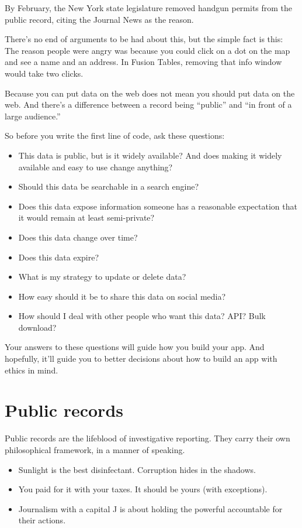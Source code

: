 \documentclass[
  letterpaper,
  DIV=11,
  numbers=noendperiod]{scrreprt}
\providecommand{\tightlist}{%
  \setlength{\itemsep}{0pt}\setlength{\parskip}{0pt}}\usepackage{longtable,booktabs,array}
\begin{document}
By February, the New York state legislature removed handgun permits from
the public record, citing the Journal News as the reason.

There's no end of arguments to be had about this, but the simple fact is
this: The reason people were angry was because you could click on a dot
on the map and see a name and an address. In Fusion Tables, removing
that info window would take two clicks.

Because you can put data on the web does not mean you should put data on
the web. And there's a difference between a record being ``public'' and
``in front of a large audience.''

So before you write the first line of code, ask these questions:

\begin{itemize}
\tightlist
\item
  This data is public, but is it widely available? And does making it
  widely available and easy to use change anything?
\item
  Should this data be searchable in a search engine?
\item
  Does this data expose information someone has a reasonable expectation
  that it would remain at least semi-private?
\item
  Does this data change over time?
\item
  Does this data expire?
\item
  What is my strategy to update or delete data?
\item
  How easy should it be to share this data on social media?
\item
  How should I deal with other people who want this data? API? Bulk
  download?
\end{itemize}

Your answers to these questions will guide how you build your app. And
hopefully, it'll guide you to better decisions about how to build an app
with ethics in mind.


\hypertarget{public-records}{%
\chapter{Public records}\label{public-records}}

Public records are the lifeblood of investigative reporting. They carry
their own philosophical framework, in a manner of speaking.

\begin{itemize}
\tightlist
\item
  Sunlight is the best disinfectant. Corruption hides in the shadows.
\item
  You paid for it with your taxes. It should be yours (with exceptions).
\item
  Journalism with a capital J is about holding the powerful accountable
  for their actions.
\end{itemize}
\end{document}
